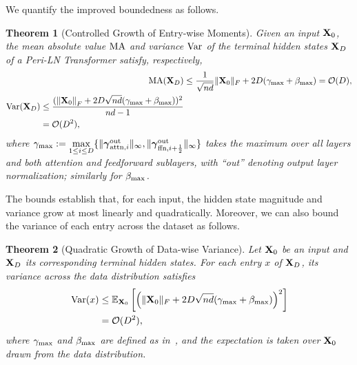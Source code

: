 \documentclass[journal]{IEEEtran}
\newcommand{\bfX}{{\bf X}}
\newcommand{\bfgamma}{{\boldsymbol \gamma}}
\theoremstyle{plain}
\newtheorem{theorem}{Theorem}
\theoremstyle{definition}
\theoremstyle{remark}
\begin{document}
We quantify the improved boundedness as follows.
\begin{theorem}[Controlled Growth of Entry-wise Moments]\label{thm:linear_growth_discrete}
    Given an input $\bfX_0$, the mean absolute value $\rm MA$ and variance $\rm Var$ of the terminal hidden states $\bfX_D$ of a Peri-LN Transformer satisfy, respectively,
    \begin{align}\label{eq:linear_growth_discrete}
        {\rm MA}(\bfX_D) &\leq \frac{1}{\sqrt{nd}} \| \bfX_0 \|_F + 2 D (\gamma_{\rm max} + \beta_{\rm max}) = \mathcal{O}(D),\\
        \begin{split}\label{eq:variance_entry_growth_discrete}
         {\rm Var}(\bfX_D) &\leq \frac{( \left\|  \bfX_{0} \right\|_F + 2D \sqrt{nd} (\gamma_{\rm max} + \beta_{\rm max}) )^2}{nd-1} \\ &= \mathcal{O}(D^2), 
    \end{split}
    \end{align}
where $\gamma_{\rm max} := \max\limits_{1 \leq i \leq D}  \{ \| \bfgamma^{\rm out}_{{\rm attn}, i} \|_\infty, \|\bfgamma^{\rm out}_{{\rm ffn}, {i+\frac{1}{2}}}\|_\infty \}$ takes the maximum over all layers and both attention and feedforward sublayers, with ``out'' denoting output layer normalization; similarly for $\beta_{\rm max}$.
\end{theorem}

The bounds establish that, for each input, the hidden state magnitude and variance grow at most linearly and quadratically. Moreover, we can also bound the variance of each entry across the dataset as follows.
\begin{theorem}[Quadratic Growth of Data-wise Variance]\label{thm:datawise_variance}
    Let $\bfX_0$ be an input and $\bfX_D$ its corresponding terminal hidden states. For each entry $x$ of $\bfX_D$, its variance across the data distribution satisfies
    \begin{equation}\label{eq:variance_across_data}
    \begin{split}
        {\rm Var}(x) &\leq \mathbb{E}_{\bfX_0} \left[ \left(  \|\bfX_0\|_F + 2D\sqrt{nd}(\gamma_{\rm max} + \beta_{\rm max}) \right)^2\right] \\
        &= \mathcal{O}(D^2),
    \end{split}
    \end{equation}
    where $ \gamma_{\rm max}$ and $\beta_{\rm max}$ are defined as in~, and the expectation is taken over $\bfX_0$ drawn from the data distribution.
\end{theorem}
\end{document}
